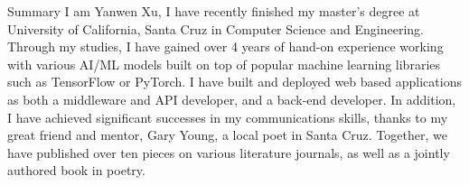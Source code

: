 \documentclass{resume} %
\begin{document}
\nobibliography*
\begin{rSection}{Summary}
I am Yanwen Xu, I have recently finished my master's degree at University of California, Santa Cruz in Computer Science and Engineering. Through my studies, I have gained over 4 years of hand-on experience working with various AI/ML models built on top of popular machine learning libraries such as TensorFlow or PyTorch. I have built and deployed web based applications as both a middleware and API developer, and a back-end developer. In addition, I have achieved significant successes in my communications skills, thanks to my great friend and mentor, Gary Young, a local poet in Santa Cruz. Together, we have published over ten pieces on various literature journals, as well as a jointly authored book in poetry. 
\end{rSection}
\end{document}

